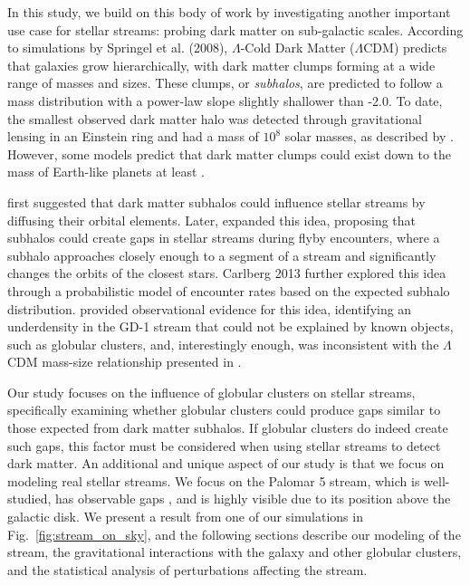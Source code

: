 \documentclass{aa}
\begin{document}
  In this study, we build on this body of work by investigating another important use case for stellar streams: probing dark matter on sub-galactic scales. According to simulations by Springel et al. (2008), $\Lambda$-Cold Dark Matter ($\Lambda$CDM) predicts that galaxies grow hierarchically, with dark matter clumps forming at a wide range of masses and sizes. These clumps, or \textit{subhalos}, are predicted to follow a mass distribution with a power-law slope slightly shallower than -2.0. To date, the smallest observed dark matter halo was detected through gravitational lensing in an Einstein ring and had a mass of $10^8$ solar masses, as described by \citet{2012Natur.481..341V}. However, some models predict that dark matter clumps could exist down to the mass of Earth-like planets at least \citep[see][ and discussion in \citet{2021arXiv211101148A}]{2005JCAP...08..003G, wang20}. 

  \citet{2002MNRAS.332..915I} first suggested that dark matter subhalos could influence stellar streams by diffusing their orbital elements. Later, \citet{2012ApJ...748...20C} expanded this idea, proposing that subhalos could create gaps in stellar streams during flyby encounters, where a subhalo approaches closely enough to a segment of a stream and significantly changes the orbits of the closest stars. Carlberg 2013 further explored this idea through a probabilistic model of encounter rates based on the expected subhalo distribution. \citet{2019ApJ...880...38B} provided observational evidence for this idea, identifying an underdensity in the GD-1 stream that could not be explained by known objects, such as globular clusters, and, interestingly enough, was inconsistent with the $\Lambda$CDM mass-size relationship presented in \cite{2017MNRAS.466.4974M}.

  Our study focuses on the influence of globular clusters on stellar streams, specifically examining whether globular clusters could produce gaps similar to those expected from dark matter subhalos. If globular clusters do indeed create such gaps, this factor must be considered when using stellar streams to detect dark matter. An additional and unique aspect of our study is that we focus on modeling real stellar streams. We focus on the Palomar 5 stream, which is well-studied, has observable gaps \citep{2020ApJ...889...70B}, and is highly visible due to its position above the galactic disk. We present a result from one of our simulations in Fig.~\ref{fig:stream_on_sky}, and the following sections describe our modeling of the stream, the gravitational interactions with the galaxy and other globular clusters, and the statistical analysis of perturbations affecting the stream.
\end{document}
